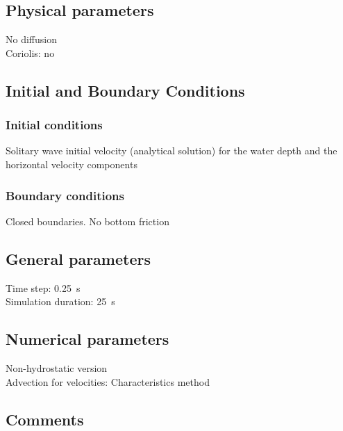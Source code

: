 \subsection{Physical parameters}
%
No diffusion\\
Coriolis: no
%
%
%
%
%
%
\subsection{Initial and Boundary Conditions}
%
\subsubsection{Initial conditions}
%
Solitary wave initial velocity (analytical solution) for the water depth
and the horizontal velocity components
%
\subsubsection{Boundary conditions}
%
Closed boundaries. No bottom friction
%
\subsection{General parameters}
%
Time step: 0.25~s\\
Simulation duration: 25~s
%
%
%
\subsection{Numerical parameters}
%
Non-hydrostatic version\\
Advection for velocities: Characteristics method
%
\subsection{Comments}
%
%
%
